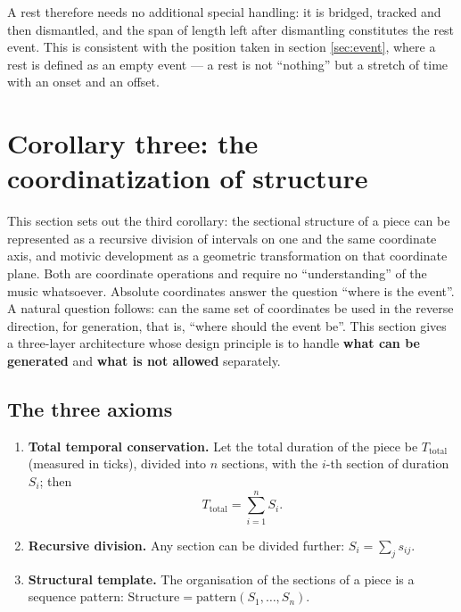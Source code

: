 \documentclass[11pt,a4paper]{article}
\begin{document}
A rest therefore needs no additional special handling: it is bridged, tracked and then
dismantled, and the span of length left after dismantling constitutes the rest event.
This is consistent with the position taken in section \ref{sec:event}, where a rest is
defined as an empty event --- a rest is not ``nothing'' but a stretch of time with an
onset and an offset.
\section{Corollary three: the coordinatization of structure}
\label{sec:gen}

This section sets out the third corollary: the sectional structure of a piece can be
represented as a recursive division of intervals on one and the same coordinate axis,
and motivic development as a geometric transformation on that coordinate plane. Both
are coordinate operations and require no ``understanding'' of the music whatsoever.
Absolute coordinates answer the question ``where is the event''. A natural question
follows: can the same set of coordinates be used in the reverse direction, for
generation, that is, ``where should the event be''. This section gives a three-layer
architecture whose design principle is to handle \textbf{what can be generated} and
\textbf{what is not allowed} separately.

\subsection{The three axioms}

\begin{enumerate}[leftmargin=2.2em,itemsep=0.15em,topsep=0.2em]
  \item \textbf{Total temporal conservation.} Let the total duration of the piece be
        $T_{\mathrm{total}}$ (measured in ticks), divided into $n$ sections, with the
        $i$-th section of duration $S_i$; then
        \begin{equation}
          \label{eq:conservation}
          T_{\mathrm{total}} = \sum_{i=1}^{n} S_i .
        \end{equation}
  \item \textbf{Recursive division.} Any section can be divided further:
        $S_i = \sum_j s_{ij}$.
  \item \textbf{Structural template.} The organisation of the sections of a piece is a
        sequence pattern:
        $\mathrm{Structure} = \mathrm{pattern}(S_1,\dots,S_n)$.
\end{enumerate}
\end{document}
